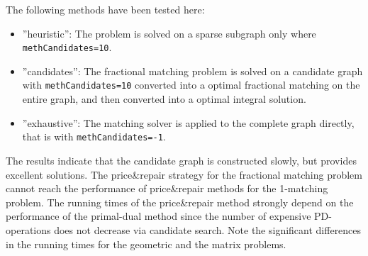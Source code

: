 \documentclass[a4paper,11pt,twoside]{book}
\begin{document}
\begin{multicols}{2}
The following methods have been tested here:
\begin{itemize}
\item ''heuristic'': The problem is solved on a sparse subgraph only where
    \verb/methCandidates=10/.
\item ''candidates'': The fractional matching problem is solved on a candidate
    graph with \verb/methCandidates=10/ converted into a optimal fractional
    matching on the entire graph, and then converted into a optimal integral
    solution.
\item ''exhaustive'': The matching solver is applied to the complete graph
    directly, that is with \verb/methCandidates=-1/.
\end{itemize}
The results indicate that the candidate graph is constructed slowly, but provides
excellent solutions. The price\&repair strategy for the fractional matching problem
cannot reach the performance of price\&repair methods for the 1-matching problem.
The running times of the price\&repair method strongly depend on the performance
of the primal-dual method since the number of expensive PD-operations does not
decrease via candidate search. Note the significant differences in the running
times for the geometric and the matrix problems.


\end{multicols}
\end{document}
